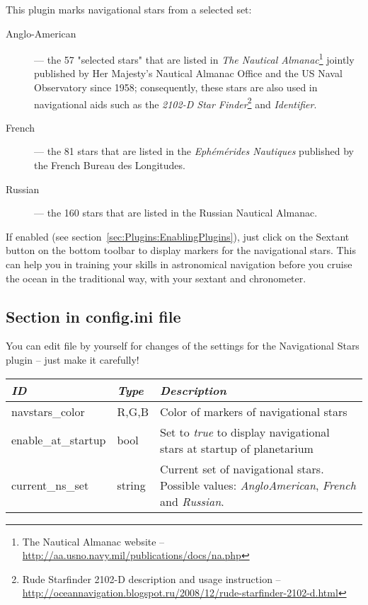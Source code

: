 \noindent This plugin marks navigational stars from a selected set:
\begin{description}
	\item[Anglo-American] --- the 57 "selected stars" that are listed in \emph{The Nautical Almanac}\footnote{The Nautical Almanac
		website -- \url{http://aa.usno.navy.mil/publications/docs/na.php}} jointly published by Her Majesty's Nautical Almanac Office and the US Naval Observatory since 1958; consequently, these stars are also used in navigational aids such as the \emph{2102-D Star Finder}\footnote{Rude Starfinder 2102-D
		description and usage instruction --
		\url{http://oceannavigation.blogspot.ru/2008/12/rude-starfinder-2102-d.html}} and \emph{Identifier}. 
	\item[French] --- the 81 stars that are listed in the \emph{Ephémérides Nautiques} published by the French Bureau des Longitudes.
	\item[Russian] --- the 160 stars that are listed in the Russian Nautical Almanac.
\end{description}
If enabled (see section~\ref{sec:Plugins:EnablingPlugins}), just click
on the Sextant button  on
the bottom toolbar to display markers for the navigational stars. This
can help you in training your skills in astronomical navigation before
you cruise the ocean in the traditional way, with your sextant and
chronometer.


\subsection{Section  in config.ini file}
\label{sec:plugins:NavigationalStars:config}

You can edit  file by yourself for changes of the
settings for the Navigational Stars plugin -- just make it carefully!

\noindent%
\begin{tabularx}{\textwidth}{l|l|X}\toprule
\emph{ID}			& \emph{Type} 	& \emph{Description}\\\midrule
navstars\_color 	& R,G,B 		& Color of markers of navigational stars  \\
enable\_at\_startup & bool 		    & Set to \emph{true} to display navigational stars at startup of planetarium  \\
current\_ns\_set	& string		& Current set of navigational stars. Possible values: \emph{AngloAmerican}, \emph{French} and \emph{Russian}. \\
\bottomrule
\end{tabularx}

